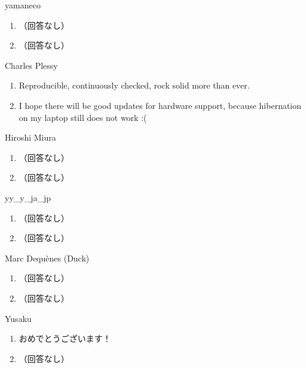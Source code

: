 \begin{prework}{ yamaneco }
  \begin{enumerate}
  \item （回答なし）
  \item （回答なし）
  \end{enumerate}
\end{prework}

\begin{prework}{ Charles Plessy }
  \begin{enumerate}
  \item Reproducible, continuously checked, rock solid more than ever.
  \item I hope there will be good updates for hardware support, because hibernation on my laptop still does not work :(
  \end{enumerate}
\end{prework}

\begin{prework}{ Hiroshi Miura }
  \begin{enumerate}
  \item （回答なし）
  \item （回答なし）
  \end{enumerate}
\end{prework}

\begin{prework}{ yy\_y\_ja\_jp }
  \begin{enumerate}
  \item （回答なし）
  \item （回答なし）
  \end{enumerate}
\end{prework}

\begin{prework}{ Marc Dequ\`enes (Duck) }
  \begin{enumerate}
  \item （回答なし）
  \item （回答なし）
  \end{enumerate}
\end{prework}

\begin{prework}{ Yusaku }
  \begin{enumerate}
  \item おめでとうございます！
  \item （回答なし）
  \end{enumerate}
\end{prework}

